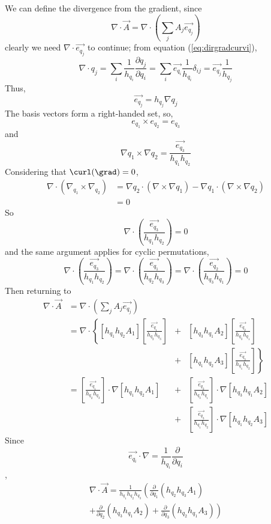We can define the divergence from the gradient, since
\[ \nabla \cdot \vec{A} = \nabla \cdot \left( \sum_j A_j \vec{e_{q_j}}
\right) \] clearly we need $\nabla \cdot \vec{e_{q_j}}$ to continue;
from equation (\ref{eq:dirgradcurvi}),
\[ \nabla \cdot q_j = \sum_i \frac{1}{h_{q_i}} \frac{\partial
  q_j}{\partial q_i} = \sum_i \vec{e_{q_i}} \frac{1}{h_{q_i}}
\delta_{ij} = \vec{e_{q_j}} \frac{1}{h_{q_j}} \] Thus,
\[\vec{e_{q_j}} = h_{q_j} \nabla q_j \]
The basis vectors form a right-handed set, so,
\[e_{q_1} \times e_{q_2} = e_{q_3} \] and
\[\nabla q_1 \times \nabla q_2 =
\frac{\vec{e_{q_3}}}{h_{q_1}h_{q_2}}\] Considering that $\curl(\grad)
= 0$,
\begin{align*} \nabla \cdot (\nabla_{q_1} \times \nabla_{q_2}) &=
  \nabla q_2 \cdot (\nabla \times \nabla q_1) - \nabla q_1 \cdot (
  \nabla \times \nabla q_2) \\ &= 0
\end{align*}
So
\[ \nabla \cdot \left( \frac{\vec{e_{q_3}}}{h_{q_1} h_{q_2}} \right) =
0 \] and the same argument applies for cyclic permutations,
\[ \nabla \cdot \left( \frac{\vec{e_{q_3}}}{h_{q_1} h_{q_2}} \right) =
\nabla \cdot \left( \frac{\vec{e_{q_1}}}{h_{q_2} h_{q_3}} \right) =
\nabla \cdot \left( \frac{\vec{e_{q_2}}}{h_{q_3} h_{q_1}} \right) =
0 \] Then returning to
\begin{align*}
  \nabla \cdot \vec{A} &= \nabla \cdot \left( \sum_j A_j \vec{e_{q_j}} \right) &\\
  &= \nabla \cdot \left\{ [h_{q_1}h_{q_2}A_1] \left[
      \frac{\vec{e_{q_1}}}{h_{q_2} h_{q_3}} \right] \right.
  &+& [h_{q_3}h_{q_1}A_2] \left[ \frac{\vec{e_{q_2}}}{h_{q_3} h_{q_1}} \right] \\
  &&+&\left.[h_{q_1} h_{q_2}A_3]  \left[ \frac{\vec{e_{q_3}}}{h_{q_1} h_{q_2}} \right]  \right\} \\
  &= \left[ \frac{\vec{e_{q_1}}}{h_{q_2} h_{q_3}} \right] \cdot \nabla
  [h_{q_1}h_{q_2}A_1]
  &+&\left[ \frac{\vec{e_{q_2}}}{h_{q_3} h_{q_1}} \right] \cdot \nabla [h_{q_3}h_{q_1}A_2]\\
  &&+&\left[ \frac{\vec{e_{q_3}}}{h_{q_1} h_{q_2}} \right]\cdot \nabla
  [h_{q_1}h_{q_2}A_3]
\end{align*}
Since
\[\vec{e_{q_i}} \cdot \nabla = \frac{1}{h_{q_i}}
\frac{\partial}{\partial q_i}\],
\begin{equation}
  \label{eq:divincurvi}
  \begin{split}
    \nabla \cdot \vec{A} = \frac{1}{h_{q_1}h_{q_2}h_{q_3}} \left( \frac{\partial}{\partial q_1} (h_{q_2} h_{q_3} A_1) \right. \\
    + \left. \frac{\partial}{\partial q_2} (h_{q_3} h_{q_1} A_2) +
      \frac{\partial}{\partial q_3} (h_{q_2} h_{q_1} A_3) \right)
  \end{split}
\end{equation}

